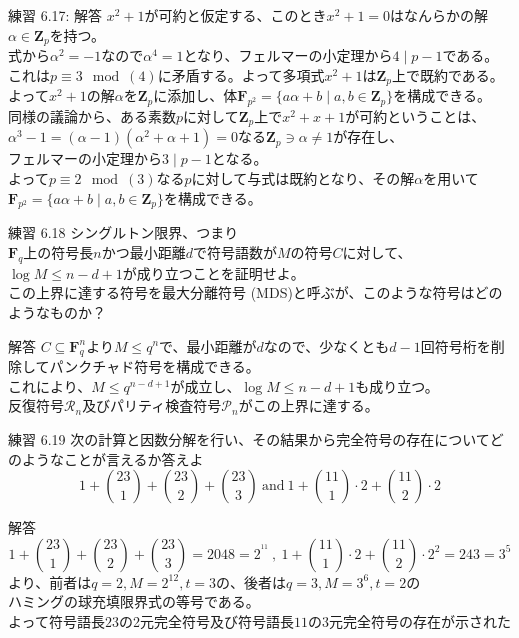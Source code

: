 \documentclass[dvipdfmx,10pt,jsarticle]{beamer}
\begin{document}
  \begin{frame}{練習 6.17: 解答}
    $x^2 + 1$が可約と仮定する、このとき$x^2+ 1 = 0$はなんらかの解$\alpha \in \mathbf{Z}_p$を持つ。\\
    式から$\alpha^2 = -1 $なので$\alpha^4 = 1$となり、フェルマーの小定理から$4 \mid p-1$である。\\
    これは$p \equiv 3 \mod (4)$に矛盾する。よって多項式$x^2 + 1$は$\mathbf{Z}_p$上で既約である。 \\
    よって$x^2 + 1$の解$\alpha$を$\mathbf{Z}_p$に添加し、体$\mathbf{F}_{p^2} = \lbrace a \alpha + b \mid a, b \in \mathbf{Z}_p \rbrace$を構成できる。 \\
    同様の議論から、ある素数$p$に対して$\mathbf{Z}_p$上で$x^2 + x + 1$が可約ということは、$\alpha^3 - 1 = (\alpha - 1)(\alpha^2 + \alpha + 1) = 0$なる$\mathbf{Z}_p \ni \alpha \neq 1$が存在し、\\
    フェルマーの小定理から$3 \mid p - 1$となる。\\
    よって$p \equiv 2 \mod (3)$なる$p$に対して与式は既約となり、その解$\alpha$を用いて$\mathbf{F}_{p^2} = \lbrace a \alpha + b \mid a, b \in \mathbf{Z}_p \rbrace$を構成できる。
  \end{frame}

  \begin{frame}{練習 6.18}
    シングルトン限界、つまり\\
    $\mathbf{F}_q$上の符号長$n$かつ最小距離$d$で符号語数が$M$の符号$C$に対して、$\log M \leq n - d + 1$が成り立つことを証明せよ。\\
    この上界に達する符号を最大分離符号 (MDS)と呼ぶが、このような符号はどのようなものか？
    \begin{block}{解答}
      $C \subseteq \mathbf{F}_q^n$より$M \leq q^n$で、最小距離が$d$なので、少なくとも$d - 1$回符号桁を削除してパンクチャド符号を構成できる。\\
      これにより、$M \leq q^{n - d + 1}$が成立し、$\log M \leq n - d + 1$も成り立つ。 \\
      反復符号$\mathcal{R}_n$及びパリティ検査符号$\mathcal{P}_n$がこの上界に達する。
    \end{block}
  \end{frame}

  \begin{frame}{練習 6.19}
    次の計算と因数分解を行い、その結果から完全符号の存在についてどのようなことが言えるか答えよ
    \[ 1 + \binom{23}{1} + \binom{23}{2} + \binom{23}{3} \  \text{and} \  1 + \binom{11}{1}\cdot 2 + \binom{11}{2} \cdot 2\]
    \begin{block}{解答}
      \[1 + \binom{23}{1} + \binom{23}{2} + \binom{23}{3} = 2048 = 2^{^{11}} \ , \ 1 + \binom{11}{1}\cdot 2 + \binom{11}{2} \cdot 2^2 = 243 =  3^5\]
      より、前者は$q = 2, M = 2^{12}, t = 3$の、後者は$q = 3, M = 3^6, t = 2$の\\ハミングの球充填限界式の等号である。\\
      よって符号語長$23$の2元完全符号及び符号語長$11$の3元完全符号の存在が示された
    \end{block}
  \end{frame}
\end{document}
